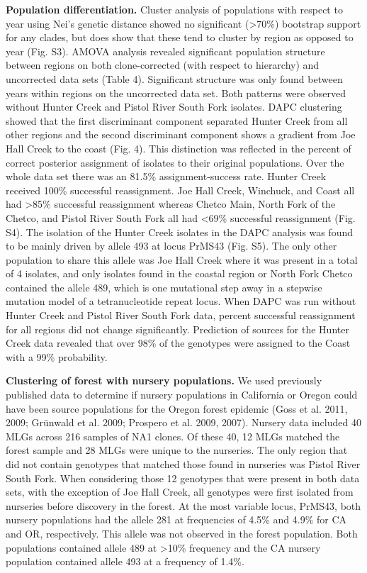 \documentclass[double,12pt]{beavtex}
\begin{document}
  \textbf{Population differentiation.} Cluster analysis of populations
  with respect to year using Nei's genetic distance showed no significant
  (\textgreater70\%) bootstrap support for any clades, but does show that
  these tend to cluster by region as opposed to year (Fig. S3). AMOVA
  analysis revealed significant population structure between regions on
  both clone-corrected (with respect to hierarchy) and uncorrected data
  sets (Table 4). Significant structure was only found between years
  within regions on the uncorrected data set. Both patterns were observed
  without Hunter Creek and Pistol River South Fork isolates. DAPC
  clustering showed that the first discriminant component separated Hunter
  Creek from all other regions and the second discriminant component shows
  a gradient from Joe Hall Creek to the coast (Fig. 4). This distinction
  was reflected in the percent of correct posterior assignment of isolates
  to their original populations. Over the whole data set there was an
  81.5\% assignment-success rate. Hunter Creek received 100\% successful
  reassignment. Joe Hall Creek, Winchuck, and Coast all had
  \textgreater85\% successful reassignment whereas Chetco Main, North Fork
  of the Chetco, and Pistol River South Fork all had \textless{}69\%
  successful reassignment (Fig. S4). The isolation of the Hunter Creek
  isolates in the DAPC analysis was found to be mainly driven by allele
  493 at locus PrMS43 (Fig. S5). The only other population to share this
  allele was Joe Hall Creek where it was present in a total of 4 isolates,
  and only isolates found in the coastal region or North Fork Chetco
  contained the allele 489, which is one mutational step away in a
  stepwise mutation model of a tetranucleotide repeat locus. When DAPC was
  run without Hunter Creek and Pistol River South Fork data, percent
  successful reassignment for all regions did not change significantly.
  Prediction of sources for the Hunter Creek data revealed that over 98\%
  of the genotypes were assigned to the Coast with a 99\% probability.
  
  \textbf{Clustering of forest with nursery populations.} We used
  previously published data to determine if nursery populations in
  California or Oregon could have been source populations for the Oregon
  forest epidemic (Goss et al. 2011, 2009; Grünwald et al. 2009; Prospero
  et al. 2009, 2007). Nursery data included 40 MLGs across 216 samples of
  NA1 clones. Of these 40, 12 MLGs matched the forest sample and 28 MLGs
  were unique to the nurseries. The only region that did not contain
  genotypes that matched those found in nurseries was Pistol River South
  Fork. When considering those 12 genotypes that were present in both data
  sets, with the exception of Joe Hall Creek, all genotypes were first
  isolated from nurseries before discovery in the forest. At the most
  variable locus, PrMS43, both nursery populations had the allele 281 at
  frequencies of 4.5\% and 4.9\% for CA and OR, respectively. This allele
  was not observed in the forest population. Both populations contained
  allele 489 at \textgreater10\% frequency and the CA nursery population
  contained allele 493 at a frequency of 1.4\%.
  
\end{document}
